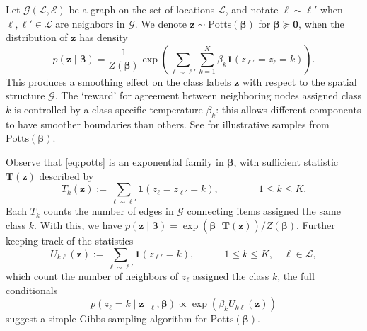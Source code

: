 \documentclass[12pt]{article}
\newcommand{\GG}{\mathcal{G}}
\newcommand{\LL}{\mathcal{L}}
\begin{document}
Let $\GG(\LL, \mathcal{E})$ be a graph on the set of locations $\LL$, and
notate $\ell \sim \ell'$ when $\ell, \ell' \in \LL$ are neighbors in $\GG$.
We denote $\bm{z} \sim \text{Potts}(\bm\beta)$ for $\bm\beta \succeq \bm0$,
when the distribution of $\bm{z}$ has density
\begin{equation}
\label{eq:potts}
    p(\bm{z} \mid \bm\beta) = \frac{1}{Z(\bm{\beta})} \exp\left(\sum_{\ell \sim \ell'} \sum_{k = 1}^K \beta_k \bm{1}(z_{\ell'} = z_{\ell} = k)\right).
\end{equation}
This produces a smoothing effect on the class labels $\bm{z}$ with respect to
the spatial structure $\GG$.
The `reward' for agreement between neighboring nodes assigned class $k$ is
controlled by a class-specific temperature $\beta_k$: this allows different
components to have smoother boundaries than others.
See  for illustrative samples from
$\text{Potts}(\bm\beta)$.

Observe that \eqref{eq:potts} is an exponential family in $\bm\beta$, with
sufficient statistic $\bm{T}(\bm{z})$ described by
\begin{equation}
    T_k(\bm{z})
        := \sum_{\ell\sim\ell'} \bm{1}(z_\ell = z_{\ell'} = k), \qquad\qquad 1 \leq k \leq K.
\end{equation}
Each $T_k$ counts the number of edges in $\GG$ connecting items
assigned the same class $k$.
With this, we have $p(\bm{z}\mid\bm{\beta}) = \exp(\bm\beta^\top
\bm{T}(\bm{z})) / Z(\bm\beta)$.
Further keeping track of the statistics
\begin{equation}
    U_{k\ell}(\bm{z}) := \sum_{\ell \sim \ell'} \bm{1}(z_{\ell'} = k), \quad\qquad 1 \leq k \leq K, \quad \ell \in \LL,
\end{equation}
which count the number of neighbors of $z_\ell$ assigned the class $k$, the
full conditionals
\begin{equation}
    p(z_{\ell} = k\mid \bm{z}_{-\ell}, \bm\beta) \propto \exp\left(\beta_k U_{k\ell}(\bm{z})\right)
\end{equation}
suggest a simple Gibbs sampling algorithm for $\text{Potts}(\bm\beta)$.


\end{document}
